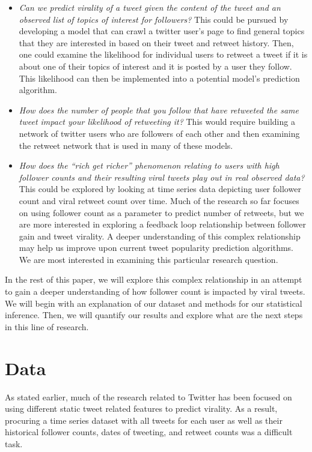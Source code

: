 \documentclass[twoside,twocolumn]{article}
\begin{document}
\begin{itemize}
  \item \textit{Can we predict virality of a tweet given the content of the tweet and an observed list of topics of interest for followers? } This could be pursued by developing a model that can crawl a twitter user’s page to find general topics that they are interested in based on their tweet and retweet history. Then, one could examine the likelihood for individual users to retweet a tweet if it is about one of their topics of interest and it is posted by a user they follow. This likelihood can then be implemented into a potential model’s prediction algorithm.\\
  \item \textit{How does the number of people that you follow that have retweeted the same tweet impact your likelihood of retweeting it?} This would require building a network of twitter users who are followers of each other and then examining the retweet network that is used in many of these models.\\
  \item \textit{How does the “rich get richer” phenomenon relating to users with high follower counts and their resulting viral tweets play out in real observed data?} This could be explored by looking at time series data depicting user follower count and viral retweet count over time. Much of the research so far focuses on using follower count as a parameter to predict number of retweets, but we are more interested in exploring a feedback loop relationship between follower gain and tweet virality. A deeper understanding of this complex relationship may help us improve upon current tweet popularity prediction algorithms. We are most interested in examining this particular research question. 

\end{itemize}
In the rest of this paper, we will explore this complex relationship in an attempt to gain a deeper understanding of how follower count is impacted by viral tweets. We will begin with an explanation of our dataset and methods for our statistical inference. Then, we will quantify our results and explore what are the next steps in this line of research.

\section{Data}
As stated earlier, much of the research related to Twitter has been focused on using different static tweet related features to predict virality. As a result, procuring a time series dataset with all tweets for each user as well as their historical follower counts, dates of tweeting, and retweet counts was a difficult task. \\
\end{document}
